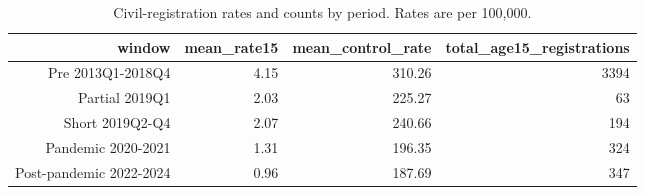 \begin{table}[!htbp]
\centering
\caption{Civil-registration rates and counts by period. Rates are per 100,000.} 
\label{tab:registry_descriptive}
\begingroup\small
\begin{tabular}{rrrr}
  \hline
window & mean\_rate15 & mean\_control\_rate & total\_age15\_registrations \\ 
  \hline
Pre 2013Q1-2018Q4 & 4.15 & 310.26 & 3394 \\ 
  Partial 2019Q1 & 2.03 & 225.27 &  63 \\ 
  Short 2019Q2-Q4 & 2.07 & 240.66 & 194 \\ 
  Pandemic 2020-2021 & 1.31 & 196.35 & 324 \\ 
  Post-pandemic 2022-2024 & 0.96 & 187.69 & 347 \\ 
   \hline
\end{tabular}
\endgroup
\end{table}
